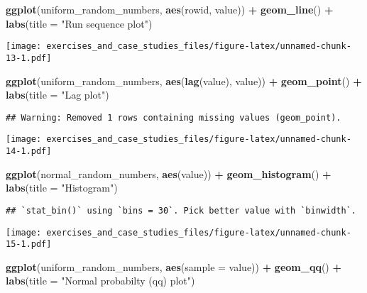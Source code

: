 \documentclass[]{book}
\newenvironment{Shaded}{\begin{snugshade}}{\end{snugshade}}
\newcommand{\DataTypeTok}[1]{\textcolor[rgb]{0.13,0.29,0.53}{#1}}
\newcommand{\KeywordTok}[1]{\textcolor[rgb]{0.13,0.29,0.53}{\textbf{#1}}}
\newcommand{\NormalTok}[1]{#1}
\newcommand{\OperatorTok}[1]{\textcolor[rgb]{0.81,0.36,0.00}{\textbf{#1}}}
\newcommand{\StringTok}[1]{\textcolor[rgb]{0.31,0.60,0.02}{#1}}
\theoremstyle{definition}
\theoremstyle{definition}
\theoremstyle{definition}
\theoremstyle{remark}
\begin{document}
\begin{Shaded}
\begin{Highlighting}[]
\KeywordTok{ggplot}\NormalTok{(uniform_random_numbers, }\KeywordTok{aes}\NormalTok{(rowid, value)) }\OperatorTok{+}
\StringTok{  }\KeywordTok{geom_line}\NormalTok{() }\OperatorTok{+}
\StringTok{  }\KeywordTok{labs}\NormalTok{(}\DataTypeTok{title =} \StringTok{"Run sequence plot"}\NormalTok{)}
\end{Highlighting}
\end{Shaded}

\texttt{[image: exercises\_and\_case\_studies\_files/figure-latex/unnamed-chunk-13-1.pdf]}

\begin{Shaded}
\begin{Highlighting}[]
\KeywordTok{ggplot}\NormalTok{(uniform_random_numbers, }\KeywordTok{aes}\NormalTok{(}\KeywordTok{lag}\NormalTok{(value), value)) }\OperatorTok{+}
\StringTok{  }\KeywordTok{geom_point}\NormalTok{() }\OperatorTok{+}
\StringTok{  }\KeywordTok{labs}\NormalTok{(}\DataTypeTok{title =} \StringTok{"Lag plot"}\NormalTok{)}
\end{Highlighting}
\end{Shaded}

\begin{verbatim}
## Warning: Removed 1 rows containing missing values (geom_point).
\end{verbatim}

\texttt{[image: exercises\_and\_case\_studies\_files/figure-latex/unnamed-chunk-14-1.pdf]}

\begin{Shaded}
\begin{Highlighting}[]
\KeywordTok{ggplot}\NormalTok{(normal_random_numbers, }\KeywordTok{aes}\NormalTok{(value)) }\OperatorTok{+}
\StringTok{  }\KeywordTok{geom_histogram}\NormalTok{() }\OperatorTok{+}
\StringTok{  }\KeywordTok{labs}\NormalTok{(}\DataTypeTok{title =} \StringTok{"Histogram"}\NormalTok{)}
\end{Highlighting}
\end{Shaded}

\begin{verbatim}
## `stat_bin()` using `bins = 30`. Pick better value with `binwidth`.
\end{verbatim}

\texttt{[image: exercises\_and\_case\_studies\_files/figure-latex/unnamed-chunk-15-1.pdf]}

\begin{Shaded}
\begin{Highlighting}[]
\KeywordTok{ggplot}\NormalTok{(uniform_random_numbers, }\KeywordTok{aes}\NormalTok{(}\DataTypeTok{sample =}\NormalTok{ value)) }\OperatorTok{+}
\StringTok{  }\KeywordTok{geom_qq}\NormalTok{() }\OperatorTok{+}
\StringTok{  }\KeywordTok{labs}\NormalTok{(}\DataTypeTok{title =} \StringTok{"Normal probabilty (qq) plot"}\NormalTok{)}
\end{Highlighting}
\end{Shaded}
\end{document}
